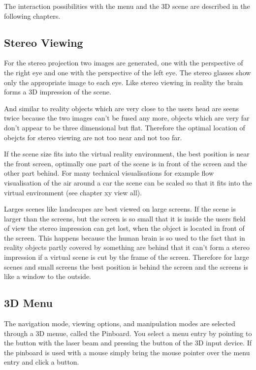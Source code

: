 The interaction possibilities with the menu and the 3D scene are described
in the following chapters.

\label{label_chapter_stereo}
\subsection{Stereo Viewing}

For the stereo projection two images are generated, one with the perspective
of the right eye and one with the perspective of the left eye. The stereo
glasses show only the appropriate image to each eye. Like stereo viewing
in reality the brain forms a 3D impression of the scene.

And similar to reality objects which are very close to the users head
are seens twice because the two images can't be fused any more, objects
which are very far don't appear to be three dimensional but flat.
Therefore the optimal location of obejcts for stereo viewing are not too
near and not too far. 

If the scene size fits into the virtual reality
environment, the best position is near the front screen, optimally one part
of the scene is in front of the screen and the other part behind. 
For many technical visualisations for example flow visualisation of
the air around a car the scene can be scaled so that it fits into the
virtual environment (see chapter xy view all).

Larges scenes like landscapes are best viewed on large screens.
If the scene is larger than the screens, but the screen is so small that it 
is inside the users field of view the stereo impression can get lost, 
when the object is located in  front of the screen. 
This happens because the human brain is so used to the fact that in reality
objects partly covered by something are behind that it can't form a stereo 
impression if a virtual scene is cut by the frame of the screen. 
Therefore for large scenes and small screens  the best position is behind 
the screen and the screens is like a window to the outside.

\label{label_chapter_3dmenu}

\subsection{3D Menu}

The navigation mode, viewing options, and manipulation modes are
selected through a 3D menue, called the Pinboard. You select a menu entry
by pointing to the button with the laser beam and pressing the 
button of the 3D input device. If the pinboard is used with a mouse
simply bring the mouse pointer over the menu entry and click a button.

